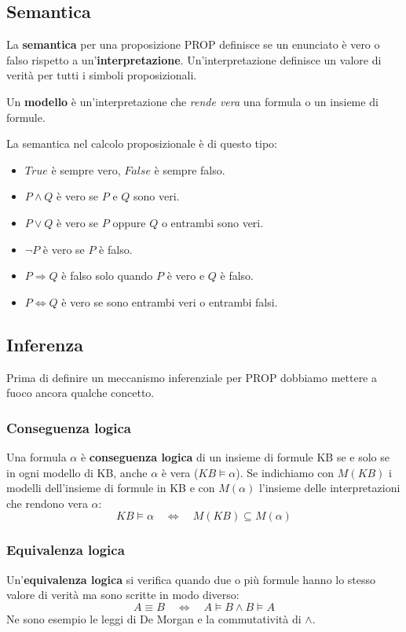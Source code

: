 \subsection{Semantica}
La \textbf{semantica} per una proposizione PROP definisce se un enunciato è vero o falso rispetto a
un'\textbf{interpretazione}. Un'interpretazione definisce un valore di verit\`a per tutti i
simboli proposizionali.

Un \textbf{modello} \`e un'interpretazione che \emph{rende vera} una formula o un insieme di formule.

La semantica nel calcolo proposizionale \`e di questo tipo:
\begin{itemize}
	\item $True$ \`e sempre vero, $False$ \`e sempre falso.
	\item $P \wedge Q$ \`e vero se $P$ e $Q$ sono veri.
	\item $P \vee Q$ \`e vero se $P$ oppure $Q$ o entrambi sono veri.
	\item $\lnot P$ \`e vero se $P$ \`e falso.
	\item $P \Rightarrow Q$ \`e falso solo quando $P$ \`e vero e $Q$ \`e falso.
	\item $P \Leftrightarrow Q$ \`e vero se sono entrambi veri o entrambi falsi.
\end{itemize}

\subsection{Inferenza}
Prima di definire un meccanismo inferenziale per PROP dobbiamo mettere a fuoco ancora qualche concetto.

\subsubsection{Conseguenza logica}
Una formula $\alpha$ \`e \textbf{conseguenza logica} di un insieme di formule KB se e solo se in ogni modello di KB,
anche $\alpha$ \`e vera ($KB \models \alpha$). Se indichiamo con $M(KB)$ i modelli dell'insieme di formule in KB e
con $M(\alpha)$ l'insieme delle interpretazioni che rendono vera $\alpha$:
\[ KB \models \alpha \quad \Leftrightarrow \quad M(KB) \subseteq M(\alpha) \]

\subsubsection{Equivalenza logica}
Un'\textbf{equivalenza logica} si verifica quando due o pi\`u formule hanno lo stesso valore di verit\`a ma sono scritte
in modo diverso:
\[ A \equiv B \quad \Leftrightarrow \quad A \models B \wedge B \models A \]
Ne sono esempio le leggi di De Morgan e la commutativit\`a di $\wedge$.

